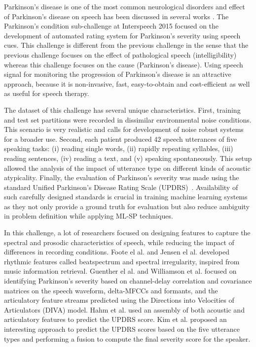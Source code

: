 \documentclass{article}
\begin{document}
Parkinson's disease is one of the most common neurological disorders and effect of Parkinson's disease on speech has been discussed in several works \cite{lieberman1992speech,kempler2002effect}.
The Parkinson's condition sub-challenge at Interspeech 2015 focused on the development of automated rating system for Parkinson's severity using speech cues.
This challenge is different from the previous challenge in the sense that the previous challenge focuses on the effect of pathological speech (intelligibility) whereas this challenge focuses on the cause (Parkinson's disease). 
Using speech signal for monitoring the progression of Parkinson's disease is an attractive approach, because it is non-invasive, fast, easy-to-obtain and cost-efficient as well as useful for speech therapy.

The dataset of this challenge has several unique characteristics. 
First, training and test set partitions were recorded in dissimilar environmental noise conditions.
This scenario is very realistic and calls for development of noise robust systems for a broader use. 
Second, each patient produced 42 speech utterances of five speaking tasks: (i) reading single words, (ii) rapidly repeating syllables, (iii) reading sentences, (iv) reading a text, and (v) speaking spontaneously.
This setup allowed the analysis of the impact of utterance type on different kinds of acoustic atypicality.
Finally, the evaluation of Parkinson's severity was made using the standard Unified Parkinson's Disease Rating Scale (UPDRS)~\cite{stebbins1998factor}.
Availability of such carefully designed standards is crucial in training machine learning systems as they not only provide a ground truth for evaluation but also reduce ambiguity in problem definition while applying ML-SP techniques.

In this challenge, a lot of researchers focused on designing features to capture the spectral and prosodic characteristics of speech, while reducing the impact of differences in recording conditions.
Foote el al. \cite{foote2002audio} and Jensen el al. \cite{jensen1999timbre} developed rhythmic features called beatspectrum and spectral irregularity, inspired from music information retrieval.
Guenther el al. \cite{guenther2006neural} and Williamson et al. \cite{williamson2015segment} focused on identifying Parkinson's severity based on channel-delay correlation and covariance matrices on the speech waveform, delta-MFCCs and formants, and the articulatory feature streams predicted using the Directions into Velocities of Articulators (DIVA) model.
Hahm et al. \cite{hahm2015parkinson} used an assembly of both acoustic and articulatory features to predict the UPDRS score.
Kim et al. \cite{kim2015automatic} proposed an interesting approach to predict the UPDRS scores based on the five utterance types and performing a fusion to compute the final severity score for the speaker.
\end{document}
